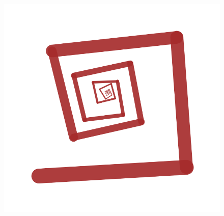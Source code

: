 \begin{figure}[H]
				\includegraphics[width=0.29\TW]{img/Randomness/Node/ran_spir_04.png}
			\end{figure}